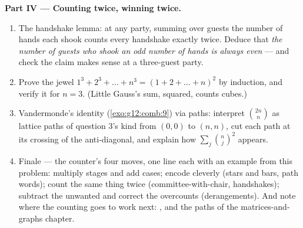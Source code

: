 \begin{problem}
\medskip
\noindent\textbf{Part IV --- Counting twice, winning twice.}
\begin{enumerate}[resume]
  \item The handshake lemma: at any party, summing over guests
        the number of hands each shook counts every handshake
        exactly twice. Deduce that \emph{the number of guests
        who shook an odd number of hands is always even} ---
        and check the claim makes sense at a three-guest party.
  \item Prove the jewel
        $1^3 + 2^3 + \dots + n^3 = (1 + 2 + \dots + n)^2$ by
        induction, and verify it for $n = 3$. (Little Gauss's
        sum, squared, counts cubes.)
  \item Vandermonde's identity (\cref{exo:g12:comb:9}) via
        paths: interpret $\binom{2n}{n}$ as lattice paths of
        question 3's kind from $(0,0)$ to $(n,n)$, cut each
        path at its crossing of the anti-diagonal, and explain
        how $\sum_j \binom nj^2$ appears.
  \item Finale --- the counter's four moves, one line each with
        an example from this problem: multiply stages and add
        cases; encode cleverly (stars and bars, path words);
        count the same thing twice (committee-with-chair,
        handshakes); subtract the unwanted and correct the
        overcounts (derangements). And note where the counting
        goes to work next: , and the paths of the
        matrices-and-graphs chapter.
\end{enumerate}
\end{problem}
